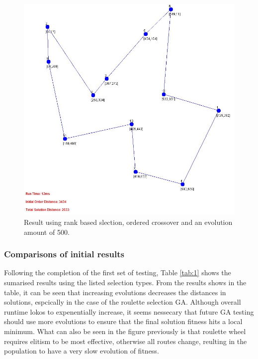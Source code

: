 \documentclass[article]{IEEEtran}
\begin{document}
\begin{figure}[H]
\centering
  \includegraphics[width=.9\linewidth]{images/ordered_tournament_015_1000_true}
  \caption{Result using rank based slection, ordered crossover and an evolution amount of 500.}
  \label{fig:13}
\end{figure}

\subsubsection{Comparisons of initial results}
Following the completion of the first set of testing, Table \ref{tab:1} shows the sumarised results using the listed selection types. From the results shows in the table, it can be seen that increasing evolutions decreases the distances in solutions, espcically in the case of the roulette selection GA. Although overall runtime lokos to expenentially increase, it seems nessecary that future GA testing should use more evolutions to ensure that the final solution fitness hits a local minimum. What can also be seen in the figure previously is that roulette wheel requires elitism to be most effective, otherwise all routes change, reulting in the population to have a very slow evolution of fitness.
\end{document}
